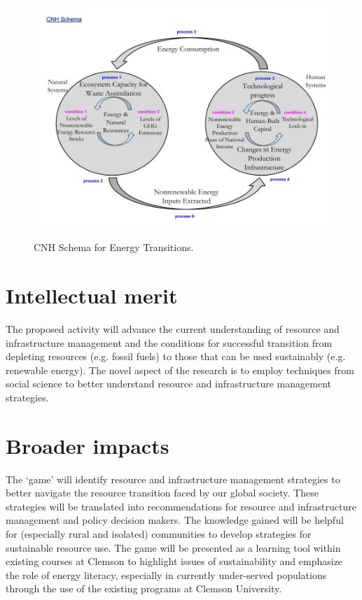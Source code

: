 \documentclass[11pt,a4paper]{article}
\begin{document}
\begin{figure}
\centering\
\includegraphics[width=\linewidth]{CNH_Schema.jpg}
\caption[CNH Schema]{CNH Schema for Energy Transitions.}
\label{fig:CNH_Schema}
\end{figure}
\vspace*{-0.1in}
\section*{Intellectual merit}
\vspace*{-0.1in}

The proposed activity will advance the current understanding of 
resource and infrastructure management and 
the conditions for successful transition from depleting resources (e.g. fossil fuels) 
to those that can be used sustainably (e.g. renewable energy). 
The novel aspect of the research is to employ techniques from social science 
to better understand resource and infrastructure management strategies.

\vspace*{-0.1in}
\section*{Broader impacts}
\vspace*{-0.1in}


The `game' will identify resource and infrastructure management strategies 
to better navigate the resource transition faced by our global society. 
These strategies will be translated into recommendations for 
resource and infrastructure management and policy decision makers. 
The knowledge gained will be helpful for (especially rural and isolated) communities 
to develop strategies for sustainable resource use. 
The game will be presented as a learning tool within existing courses at Clemson 
to highlight issues of sustainability and emphasize the role of energy literacy, 
especially in currently under-served populations 
through the use of the existing programs at Clemson University.  
\end{document}
